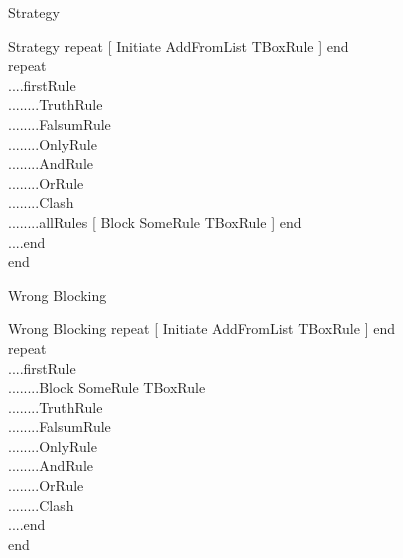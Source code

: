 \documentclass{beamer}
\begin{document}



\begin{frame}{Strategy}

\begin{block}{Strategy}
repeat [ Initiate AddFromList TBoxRule ] end\\
repeat\\
....firstRule\\
........TruthRule\\
........FalsumRule\\
........OnlyRule\\
........AndRule\\
........OrRule\\
........Clash\\
........allRules [ Block SomeRule TBoxRule ] end \\
....end\\
end
\end{block}

\end{frame}




\begin{frame}{Wrong Blocking}

\begin{block}{Wrong Blocking}
repeat [ Initiate AddFromList TBoxRule ] end\\
repeat\\
....firstRule\\
........Block SomeRule TBoxRule\\
........TruthRule\\
........FalsumRule\\
........OnlyRule\\
........AndRule\\
........OrRule\\
........Clash\\
....end\\
end
\end{block}

\end{frame}
\end{document}

